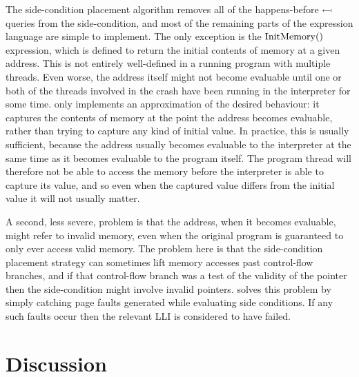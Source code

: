 The side-condition placement algorithm removes
all of the happens-before $\leftarrowtail$ queries from the
side-condition, and most of the remaining parts of the {\StateMachine}
expression language are simple to implement.  The only exception is
the $\mathrm{InitMemory}()$ expression, which is defined to return the initial
contents of memory at a given address.  This is not entirely
well-defined in a running program with multiple threads.  Even worse,
the address itself might not become evaluable until one or both of
the threads involved in the crash have been running in the interpreter
for some time.  {\Implementation} only implements an approximation of
the desired behaviour: it captures the contents of memory at the point
the address becomes evaluable, rather than trying to capture any
kind of initial value.  In practice, this is usually sufficient,
because the address usually becomes evaluable to the interpreter at
the same time as it becomes evaluable to the program itself.  The
program thread will therefore not be able to access the memory before
the interpreter is able to capture its value, and so even when the
captured value differs from the initial value it will not usually
matter.

A second, less severe, problem is that the address, when it becomes
evaluable, might refer to invalid memory, even when the original
program is guaranteed to only ever access valid memory.  The problem
here is that the side-condition placement strategy can sometimes lift
memory accesses past control-flow branches, and if that control-flow
branch was a test of the validity of the pointer then the
side-condition might involve invalid pointers.  {\Implementation}
solves this problem by simply catching page faults generated while
evaluating side conditions.  If any such faults occur then the
relevant LLI is considered to have failed.


\section{Discussion}

